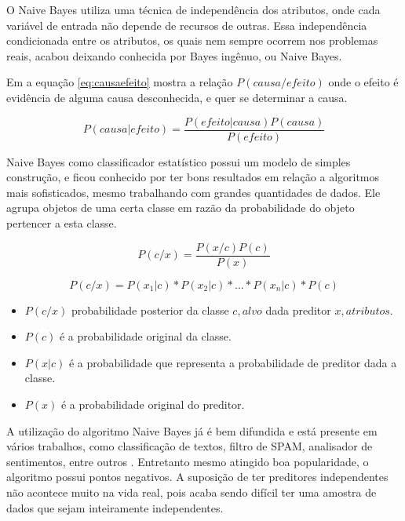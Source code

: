 O Naive Bayes utiliza uma técnica de independência dos atributos, onde cada variável de entrada não depende de recursos de outras. Essa independência condicionada  entre os atributos, os quais nem sempre ocorrem nos problemas reais, acabou deixando conhecida por Bayes ingênuo, ou Naive Bayes.

Em  a equação \ref{eq:causaefeito} mostra a relação ${P(causa/efeito)}$ onde o efeito é evidência de alguma causa desconhecida, e quer se determinar a causa.

\begin{equation} \label{eq:causaefeito}
 P(causa|efeito)= \frac{P(efeito|causa)P(causa)}{P(efeito)}
\end{equation}

Naive Bayes como classificador estatístico possui um modelo de simples construção, e ficou conhecido por ter bons resultados em relação a algoritmos mais sofisticados, mesmo trabalhando com grandes quantidades de dados. Ele agrupa objetos de uma certa classe em razão da probabilidade do objeto pertencer a esta classe. 

\begin{equation}
 P(c/x)= \frac{P(x/c)P(c)}{P(x)}
\end{equation}

\begin{equation}
 P(c/x)=P(x_1|c)*P(x_2|c)*...*P(x_n|c)*P(c)
 \label{eq:bayes}
\end{equation}


\begin{itemize}
 \item ${P(c/x)}$ probabilidade posterior da classe ${c,alvo}$ dada preditor ${x,atributos}$.
 \item ${P(c)}$  é a probabilidade original da classe.
 \item ${P(x|c)}$  é a probabilidade que representa a probabilidade de preditor dada a classe.
 \item ${P(x)}$  é a probabilidade original do preditor.
\end{itemize}

A utilização do algoritmo Naive Bayes já é bem difundida e está presente em vários trabalhos, como classificação de textos, filtro de SPAM, analisador de sentimentos, entre outros \cite{Madureira2017, Lucca2013, Wu2008, Mccallum1997}. Entretanto mesmo atingido boa popularidade, o algoritmo possui pontos negativos. A suposição de ter preditores independentes não acontece muito na vida real, pois acaba sendo difícil ter uma amostra de dados que sejam inteiramente independentes. 

